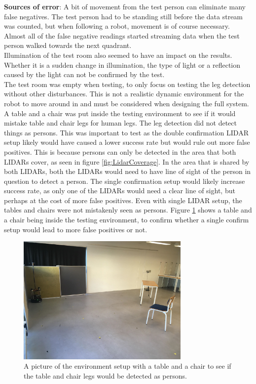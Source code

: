\textbf{Sources of error}:
A bit of movement from the test person can eliminate many false negatives. The test person had to be standing still before the data stream was counted, but when following a robot, movement is of course necessary. Almost all of the false negative readings started streaming data when the test person walked towards the next quadrant.\\

Illumination of the test room also seemed to have an impact on the results. Whether it is a sudden change in illumination, the type of light or a reflection caused by the light can not be confirmed by the test.\\

The test room was empty when testing, to only focus on testing the leg detection without other disturbances. This is not a realistic dynamic environment for the robot to move around in and must be considered when designing the full system. A table and a chair was put inside the testing environment to see if it would mistake table and chair legs for human legs. The leg detection did not detect things as persons. This was important to test as the double confirmation LIDAR setup likely would have caused a lower success rate but would rule out more false positives. This is because persons can only be detected in the area that both LIDARs cover, as seen in figure \ref{fig:LidarCoverage}. In the area that is shared by both LIDARs, both the LIDARs would need to have line of sight of the person in question to detect a person. The single confirmation setup would likely increase success rate, as only one of the LIDARs would need a clear line of sight, but perhaps at the cost of more false positives. Even with single LIDAR setup, the tables and chairs were not mistakenly seen as persons. Figure \ref{fig:SetupTableChair} shows a table and a chair being inside the testing environment, to confirm whether a single confirm setup would lead to more false positives or not.\\

\begin{figure}[H]
    \centering
    \includegraphics[width=0.75\textwidth]{figures/SetupTableChair.jpg}
    \caption{A picture of the environment setup with a table and a chair to see if the table and chair legs would be detected as persons.}
    \label{fig:SetupTableChair}
\end{figure}
